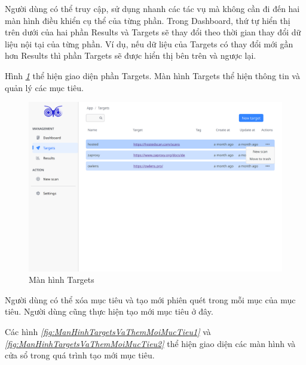 Người dùng có thể truy cập, sử dụng nhanh các tác vụ mà không cần đi đến hai màn hình điều khiển cụ thể của từng phần.
Trong Dashboard, thứ tự hiển thị trên dưới của hai phần Results và Targets sẽ thay đổi theo thời gian thay đổi dữ liệu nội tại của từng phần.
Ví dụ, nếu dữ liệu của Targets có thay đổi mới gần hơn Results thì phần Targets sẽ được hiển thị bên trên và ngược lại.

\tab \tab Hình \textit{\ref{fig:ManHinhTargets} } thể hiện giao diện phần Targets.
Màn hình Targets thể hiện thông tin và quản lý các mục tiêu.

\begin{figure}[H]
      \centering
      \includegraphics[width=\textwidth]{applied-thesis-chapters/chapter-6/Màn hình Targets.png}
      \caption{Màn hình Targets}
      \label{fig:ManHinhTargets}
\end{figure}

Người dùng có thể xóa mục tiêu và tạo mới phiên quét trong mỗi mục của mục tiêu.
Người dùng cũng thực hiện tạo mới mục tiêu ở đây.

Các hình \textit{\ref{fig:ManHinhTargetsVaThemMoiMucTieu1} } 
và \textit{\ref{fig:ManHinhTargetsVaThemMoiMucTieu2} } thể hiện giao diện các màn hình và cửa sổ trong quá trình tạo mới mục tiêu.

